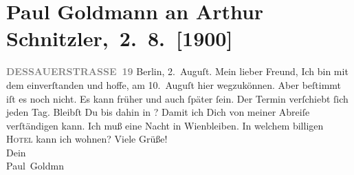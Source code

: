 

         
         \renewcommand{\erwaehntePersonen}{Personen: Paul Goldmann, Alfred Kerr}
         \renewcommand{\erwaehnteOrte}{Orte: Bad Ischl, Berlin, Dessauer Straße, Toblach, Wien}
         \renewcommand{\erwaehnteWerke}{}
               \section[ Paul Goldmann an Arthur Schnitzler, 2. 8. {[}1900{]}]{ Paul Goldmann an Arthur Schnitzler, 2. 8. {[}1900{]}}\nopagebreak{}\rehead{ }\begin{ledgroupsized}[t]{13cm}\normalsize\beginnumbering \toendnotes[C]{\smallbreak\pagebreak[2]} 
\toendnotes[C]{\smallbreak}\pstart
           \noindent{}\raggedleft{}{\pb}\textcolor{gray}{\textbf{DESSAUERSTRASSE 19}}\pend
           \pstart
           Berlin, 2. Auguſt.\pend
           \pstart\center{}Mein lieber Freund,\pend\pstart
           Ich bin mit dem \label{K_L02926-1v}\label{K_L02926-1h} einverſtanden und hoffe, am 10. Auguſt hier
               wegzukönnen. Aber beſtimmt iſt es noch nicht.  Es
               kann früher und auch ſpäter ſein. Der Termin verſchiebt ſich jeden Tag. Bleibſt Du
               bis dahin in \label{K_L02926-2v}\label{K_L02926-2h}? Damit ich Dich von meiner
               Abreiſe verſtändigen kann.\pend
           \pstart
           Ich muß eine Nacht in Wienbleiben. In welchem billigen \textsc{Hotel} kann ich wohnen?\pend
           \pstart
           Viele Grüße! {\\[\baselineskip]}Dein {\\[\baselineskip]}\spacefill\mbox{Paul Goldmn}\pend

\end{ledgroupsized}
